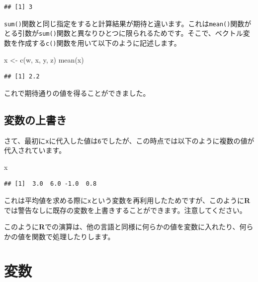 \documentclass[
  12pt,
]{book}
\newenvironment{Shaded}{\begin{snugshade}}{\end{snugshade}}
\newcommand{\FunctionTok}[1]{\textcolor[rgb]{0.00,0.00,0.00}{#1}}
\newcommand{\NormalTok}[1]{#1}
\newcommand{\OtherTok}[1]{\textcolor[rgb]{0.56,0.35,0.01}{#1}}
\begin{document}
\begin{verbatim}
## [1] 3
\end{verbatim}

\texttt{sum()}関数と同じ指定をすると計算結果が期待と違います。これは\texttt{mean()}関数がとる引数が\texttt{sum()}関数と異なりひとつに限られるためです。そこで、ベクトル変数を作成する\texttt{c()}関数を用いて以下のように記述します。

\begin{Shaded}
\begin{Highlighting}[numbers=left,,]
\NormalTok{x }\OtherTok{\textless{}{-}} \FunctionTok{c}\NormalTok{(w, x, y, z)}
\FunctionTok{mean}\NormalTok{(x)}
\end{Highlighting}
\end{Shaded}

\begin{verbatim}
## [1] 2.2
\end{verbatim}

これで期待通りの値を得ることができました。

\hypertarget{ux5909ux6570ux306eux4e0aux66f8ux304d}{%
\subsection{変数の上書き}\label{ux5909ux6570ux306eux4e0aux66f8ux304d}}

さて、最初に\texttt{x}に代入した値は\texttt{6}でしたが、この時点では以下のように複数の値が代入されています。

\begin{Shaded}
\begin{Highlighting}[numbers=left,,]
\NormalTok{x}
\end{Highlighting}
\end{Shaded}

\begin{verbatim}
## [1]  3.0  6.0 -1.0  0.8
\end{verbatim}

これは平均値を求める際に\texttt{x}という変数を再利用したためですが、このように\textbf{R}では警告なしに既存の変数を上書きすることができます。注意してください。

このように\textbf{R}での演算は、他の言語と同様に何らかの値を変数に入れたり、何らかの値を関数で処理したりします。

\hypertarget{ux5909ux6570}{%
\section{変数}\label{ux5909ux6570}}
\end{document}
